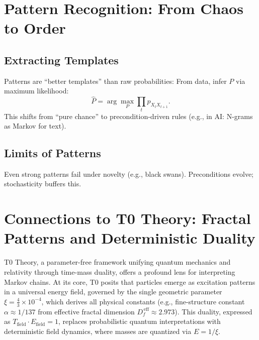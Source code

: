 	\begin{table}[h]
		\centering
		\caption{Determinism vs. Stochastics in Markov Chains}
		\label{tab:comparison}
	\end{table}
	
	\section{Pattern Recognition: From Chaos to Order}
	\label{sec:patterns}
	
	\subsection{Extracting Templates}
	Patterns are ``better templates'' than raw probabilities: From data, infer $P$ via maximum likelihood:
	\begin{equation}
		\hat{P} = \arg\max_P \prod_t p_{X_t X_{t+1}}.
	\end{equation}
	This shifts from ``pure chance'' to precondition-driven rules (e.g., in AI: N-grams as Markov for text).
	
	\subsection{Limits of Patterns}
	Even strong patterns fail under novelty (e.g., black swans). Preconditions evolve; stochasticity buffers this.
	
	\section{Connections to T0 Theory: Fractal Patterns and Deterministic Duality}
	\label{sec:t0-connection}
	
	T0 Theory, a parameter-free framework unifying quantum mechanics and relativity through time-mass duality, offers a profound lens for interpreting Markov chains. At its core, T0 posits that particles emerge as excitation patterns in a universal energy field, governed by the single geometric parameter $\xi = \frac{4}{3} \times 10^{-4}$, which derives all physical constants (e.g., fine-structure constant $\alpha \approx 1/137$ from effective fractal dimension $D_f^{\,\text{eff}} \approx 2.973$). This duality, expressed as $T_{\text{field}} \cdot E_{\text{field}} = 1$, replaces probabilistic quantum interpretations with deterministic field dynamics, where masses are quantized via $E = 1/\xi$.
	
